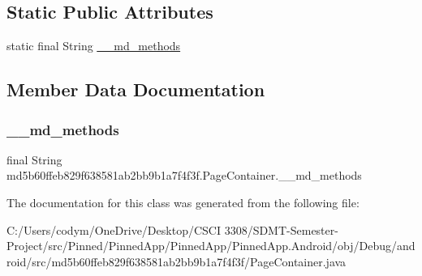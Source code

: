 \subsection*{Static Public Attributes}
\begin{DoxyCompactItemize}
\item 
static final String \hyperlink{classmd5b60ffeb829f638581ab2bb9b1a7f4f3f_1_1_page_container_ae38d550383eecfab33e3bb31102278db}{\+\_\+\+\_\+md\+\_\+methods}
\end{DoxyCompactItemize}


\subsection{Member Data Documentation}
\mbox{\label{classmd5b60ffeb829f638581ab2bb9b1a7f4f3f_1_1_page_container_ae38d550383eecfab33e3bb31102278db}} 
\subsubsection{\texorpdfstring{\+\_\+\+\_\+md\+\_\+methods}{\_\_md\_methods}}
{\footnotesize\ttfamily final String md5b60ffeb829f638581ab2bb9b1a7f4f3f.\+Page\+Container.\+\_\+\+\_\+md\+\_\+methods\hspace{0.3cm}{\ttfamily [static]}}



The documentation for this class was generated from the following file\+:\begin{DoxyCompactItemize}
\item 
C\+:/\+Users/codym/\+One\+Drive/\+Desktop/\+C\+S\+C\+I 3308/\+S\+D\+M\+T-\/\+Semester-\/\+Project/src/\+Pinned/\+Pinned\+App/\+Pinned\+App/\+Pinned\+App.\+Android/obj/\+Debug/android/src/md5b60ffeb829f638581ab2bb9b1a7f4f3f/Page\+Container.\+java\end{DoxyCompactItemize}
